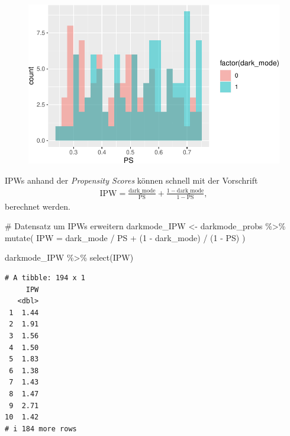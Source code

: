 \documentclass[
  a4paper,
  DIV=11,
  oneside]{scrreprt}
\newenvironment{Shaded}{\begin{snugshade}}{\end{snugshade}}
\newcommand{\AttributeTok}[1]{\textcolor[rgb]{0.40,0.45,0.13}{#1}}
\newcommand{\CommentTok}[1]{\textcolor[rgb]{0.37,0.37,0.37}{#1}}
\newcommand{\DecValTok}[1]{\textcolor[rgb]{0.68,0.00,0.00}{#1}}
\newcommand{\FunctionTok}[1]{\textcolor[rgb]{0.28,0.35,0.67}{#1}}
\newcommand{\NormalTok}[1]{\textcolor[rgb]{0.00,0.23,0.31}{#1}}
\newcommand{\OtherTok}[1]{\textcolor[rgb]{0.00,0.23,0.31}{#1}}
\newcommand{\SpecialCharTok}[1]{\textcolor[rgb]{0.37,0.37,0.37}{#1}}
\begin{document}
\begin{figure}[t]

{\centering \includegraphics{Matching_files/figure-pdf/unnamed-chunk-23-1.pdf}

}

\end{figure}

IPWs anhand der \emph{Propensity Scores} können schnell mit der
Vorschrift \begin{align}
  \text{IPW} = \frac{\text{dark\_mode}}{\text{PS}} + \frac{1 - \text{dark\_mode}}{1 - \text{PS}},
\end{align} berechnet werden.

\begin{Shaded}
\begin{Highlighting}[]
\CommentTok{\# Datensatz um IPWs erweitern}
\NormalTok{darkmode\_IPW }\OtherTok{\textless{}{-}}\NormalTok{ darkmode\_probs }\SpecialCharTok{\%\textgreater{}\%}
  \FunctionTok{mutate}\NormalTok{(}
    \AttributeTok{IPW =}\NormalTok{ dark\_mode }\SpecialCharTok{/}\NormalTok{ PS }\SpecialCharTok{+}\NormalTok{ (}\DecValTok{1} \SpecialCharTok{{-}}\NormalTok{ dark\_mode) }\SpecialCharTok{/}\NormalTok{ (}\DecValTok{1} \SpecialCharTok{{-}}\NormalTok{ PS)}
\NormalTok{  )}

\NormalTok{darkmode\_IPW }\SpecialCharTok{\%\textgreater{}\%} 
  \FunctionTok{select}\NormalTok{(IPW)}
\end{Highlighting}
\end{Shaded}

\begin{verbatim}
# A tibble: 194 x 1
     IPW
   <dbl>
 1  1.44
 2  1.91
 3  1.56
 4  1.50
 5  1.83
 6  1.38
 7  1.43
 8  1.47
 9  2.71
10  1.42
# i 184 more rows
\end{verbatim}
\end{document}
